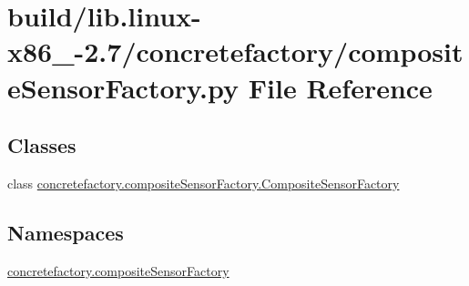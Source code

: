 \hypertarget{build_2lib_8linux-x86__64-2_87_2concretefactory_2compositeSensorFactory_8py}{}\section{build/lib.linux-\/x86\+\_-\/2.7/concretefactory/composite\+Sensor\+Factory.py File Reference}
\label{build_2lib_8linux-x86__64-2_87_2concretefactory_2compositeSensorFactory_8py}
\subsection*{Classes}
\begin{DoxyCompactItemize}
\item 
class \hyperlink{classconcretefactory_1_1compositeSensorFactory_1_1CompositeSensorFactory}{concretefactory.\+composite\+Sensor\+Factory.\+Composite\+Sensor\+Factory}
\end{DoxyCompactItemize}
\subsection*{Namespaces}
\begin{DoxyCompactItemize}
\item 
 \hyperlink{namespaceconcretefactory_1_1compositeSensorFactory}{concretefactory.\+composite\+Sensor\+Factory}
\end{DoxyCompactItemize}
